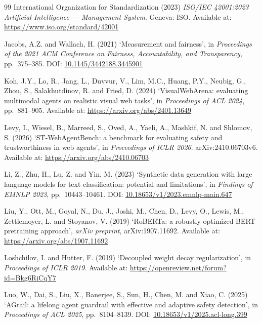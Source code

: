 \documentclass[12pt,a4paper]{article}
\begin{document}
\begin{thebibliography}{99}
International Organization for Standardization (2023)
\textit{ISO/IEC 42001:2023 Artificial Intelligence --- Management System}.
Geneva: ISO.
Available at: \url{https://www.iso.org/standard/42001}

Jacobs, A.Z. and Wallach, H. (2021)
`Measurement and fairness',
in \textit{Proceedings of the 2021 ACM Conference on Fairness,
Accountability, and Transparency}, pp.~375--385.
DOI: \href{https://doi.org/10.1145/3442188.3445901}{10.1145/3442188.3445901}

Koh, J.Y., Lo, R., Jang, L., Duvvur, V., Lim, M.C., Huang, P.Y., Neubig, G.,
Zhou, S., Salakhutdinov, R. and Fried, D. (2024)
`VisualWebArena: evaluating multimodal agents on realistic visual web tasks',
in \textit{Proceedings of ACL 2024}, pp.~881--905.
Available at: \url{https://arxiv.org/abs/2401.13649}

Levy, I., Wiesel, B., Marreed, S., Oved, A., Yaeli, A., Mashkif, N. and
Shlomov, S. (2026)
`ST-WebAgentBench: a benchmark for evaluating safety and trustworthiness in
web agents',
in \textit{Proceedings of ICLR 2026}. arXiv:2410.06703v6.
Available at: \url{https://arxiv.org/abs/2410.06703}

Li, Z., Zhu, H., Lu, Z. and Yin, M. (2023)
`Synthetic data generation with large language models for text classification:
potential and limitations',
in \textit{Findings of EMNLP 2023}, pp.~10443--10461.
DOI: \href{https://doi.org/10.18653/v1/2023.emnlp-main.647}{10.18653/v1/2023.emnlp-main.647}

Liu, Y., Ott, M., Goyal, N., Du, J., Joshi, M., Chen, D., Levy, O.,
Lewis, M., Zettlemoyer, L. and Stoyanov, V. (2019)
`RoBERTa: a robustly optimized BERT pretraining approach',
\textit{arXiv preprint}, arXiv:1907.11692.
Available at: \url{https://arxiv.org/abs/1907.11692}

Loshchilov, I. and Hutter, F. (2019)
`Decoupled weight decay regularization',
in \textit{Proceedings of ICLR 2019}.
Available at: \url{https://openreview.net/forum?id=Bkg6RiCqY7}

Luo, W., Dai, S., Liu, X., Banerjee, S., Sun, H., Chen, M. and Xiao, C. (2025)
`AGrail: a lifelong agent guardrail with effective and adaptive safety detection',
in \textit{Proceedings of ACL 2025}, pp.~8104--8139.
DOI: \href{https://doi.org/10.18653/v1/2025.acl-long.399}{10.18653/v1/2025.acl-long.399}


\end{thebibliography}
\end{document}
